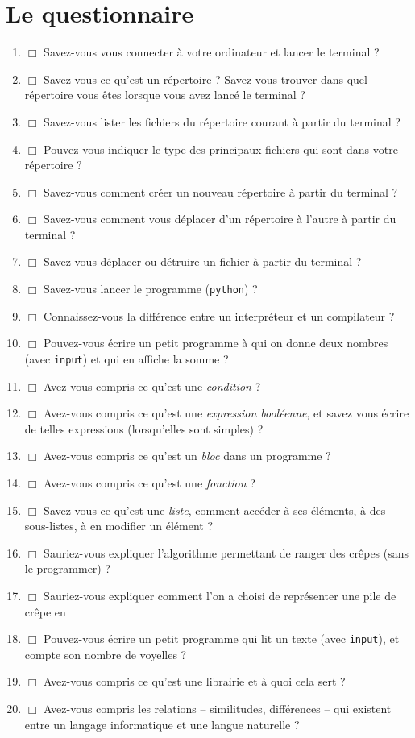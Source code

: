 \documentclass[12pt]{article}
\newcommand{\prog}[1]{\texttt{#1}}
\begin{document}
\section{Le questionnaire}
\label{note2}
\begin{enumerate}
\item $\Box$ Savez-vous vous connecter à votre ordinateur et lancer le terminal ?
\item $\Box$ Savez-vous ce qu'est un répertoire ? Savez-vous trouver dans quel répertoire vous êtes lorsque vous avez
lancé le terminal ?
\item $\Box$ Savez-vous lister les fichiers du répertoire courant à partir du terminal ?
\item $\Box$ Pouvez-vous indiquer le type des principaux fichiers qui sont dans votre répertoire ?
\item $\Box$ Savez-vous comment créer un nouveau répertoire à partir du terminal ?
\item $\Box$ Savez-vous comment vous déplacer d'un répertoire à l'autre à partir du terminal ?
\item $\Box$ Savez-vous déplacer ou détruire un fichier à partir du terminal ?
\item $\Box$ Savez-vous lancer le programme \pyth{} (\prog{python}) ?
\item $\Box$ Connaissez-vous la différence entre un interpréteur et un compilateur ?
\item $\Box$ Pouvez-vous écrire un petit programme \pyth{} à qui on donne deux nombres (avec \prog{input}) et qui en affiche la somme ?
\item $\Box$ Avez-vous compris ce qu'est une \emph{condition} ?
\item $\Box$ Avez-vous compris ce qu'est une \emph{expression booléenne}, et savez vous
écrire de telles expressions (lorsqu'elles sont simples) ?
\item $\Box$ Avez-vous compris ce qu'est un \emph{bloc} dans un programme \pyth{} ?
\item $\Box$ Avez-vous compris ce qu'est une \emph{fonction} ?
\item $\Box$ Savez-vous ce qu'est une \emph{liste}, comment accéder à ses éléments, à des sous-listes, à en modifier un élément ?
\item $\Box$ Sauriez-vous expliquer l'algorithme permettant de ranger des crêpes (sans le programmer) ?
\item $\Box$ Sauriez-vous expliquer comment l'on a choisi de représenter une pile de crêpe en \pyth{}
\item $\Box$ Pouvez-vous écrire un petit programme qui lit un texte (avec \prog{input}), et compte son nombre de voyelles ?
\item $\Box$ Avez-vous compris ce qu'est une librairie et à quoi cela sert ?
\item $\Box$ Avez-vous compris les relations -- similitudes, différences -- qui existent entre un langage informatique et une
langue naturelle ?
\end{enumerate}
\end{document}
